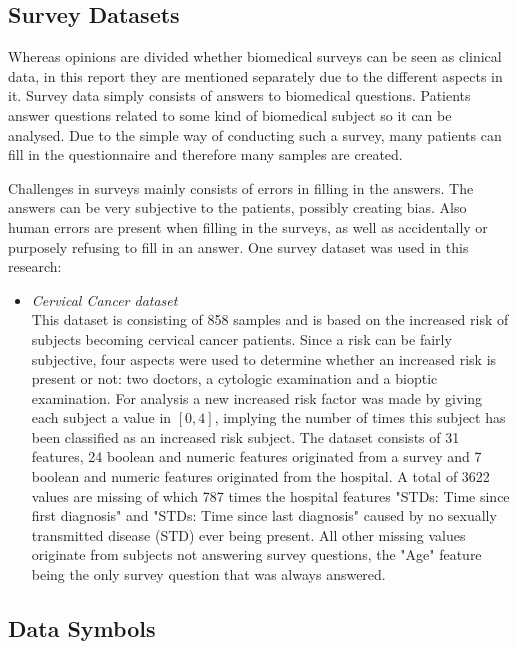 \documentclass[10pt,a4paper]{report}
\begin{document}
	\subsection{Survey Datasets}
	\label{PLsubsec:Survey}
	
	Whereas opinions are divided whether biomedical surveys can be seen as clinical data\cite{misery2011sensitive}, in this report they are mentioned separately due to the different aspects in it. Survey data simply consists of answers to biomedical questions. Patients answer questions related to some kind of biomedical subject so it can be analysed. Due to the simple way of conducting such a survey, many patients can fill in the questionnaire and therefore many samples are created.
	
	Challenges in surveys mainly consists of errors in filling in the answers. The answers can be very subjective to the patients, possibly creating bias. Also human errors are present when filling in the surveys, as well as accidentally or purposely refusing to fill in an answer. One survey dataset was used in this research:
	
	\begin{itemize}
		\item \textit{Cervical Cancer dataset} \\ This dataset is consisting of 858 samples and is based on the increased risk of subjects becoming cervical cancer patients\cite{fernandes2017transfer}. Since a risk can be fairly subjective, four aspects were used to determine whether an increased risk is present or not: two doctors, a cytologic examination and a bioptic examination. For analysis a new increased risk factor was made by giving each subject a value in $[0, 4]$, implying the number of times this subject has been classified as an increased risk subject. The dataset consists of 31 features, 24 boolean and numeric features originated from a survey and 7 boolean and numeric features originated from the hospital. A total of 3622 values are missing of which 787 times the hospital features "STDs: Time since first diagnosis" and "STDs: Time since last diagnosis" caused by no sexually transmitted disease (STD) ever being present. All other missing values originate from subjects not answering survey questions, the "Age" feature being the only survey question that was always answered.
	\end{itemize}
	
	\subsection{Data Symbols}
	\label{subsec:DataSymbols}
	
\end{document}
